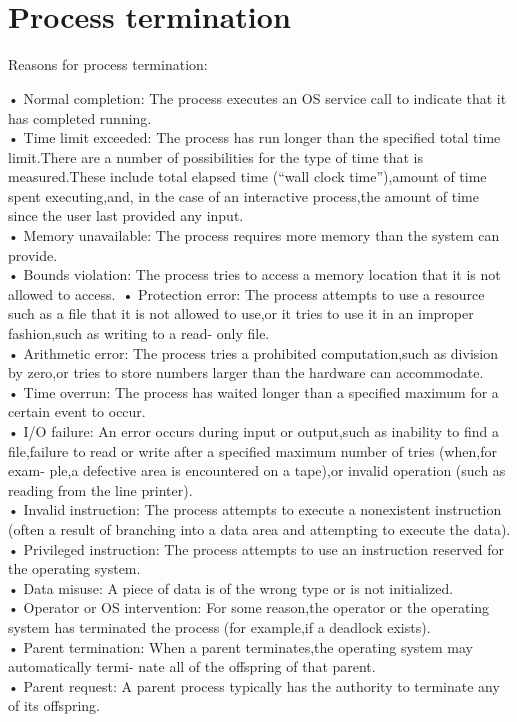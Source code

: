 \\
\\

\section{Process termination}

Reasons for process termination:\

• Normal completion: The process executes an OS service call to indicate that it has completed
running.\\
• Time limit exceeded: The process has run longer than the specified total time limit.There are a
number of possibilities for the type of time that is measured.These include
total elapsed time (“wall clock time”),amount of time spent executing,and,
in the case of an interactive process,the amount of time since the user last
provided any input.\\
• Memory unavailable: The process requires more memory than the system can provide.\\
• Bounds violation: The process tries to access a memory location that it is not allowed to access.\
• Protection error: The process attempts to use a resource such as a file that it is not allowed
to use,or it tries to use it in an improper fashion,such as writing to a read-
only file.\\
• Arithmetic error: The process tries a prohibited computation,such as division by zero,or tries
to store numbers larger than the hardware can accommodate.\\
• Time overrun: The process has waited longer than a specified maximum for a certain event
to occur.\\
• I/O failure: An error occurs during input or output,such as inability to find a file,failure
to read or write after a specified maximum number of tries (when,for exam-
ple,a defective area is encountered on a tape),or invalid operation (such as
reading from the line printer).\\
• Invalid instruction: The process attempts to execute a nonexistent instruction (often a result of
branching into a data area and attempting to execute the data).\\
• Privileged instruction: The process attempts to use an instruction reserved for the operating system.\\
• Data misuse: A piece of data is of the wrong type or is not initialized.\\
• Operator or OS intervention: For some reason,the operator or the operating system has terminated the
process (for example,if a deadlock exists).\\
• Parent termination: When a parent terminates,the operating system may automatically termi-
nate all of the offspring of that parent.\\
• Parent request: A parent process typically has the authority to terminate any of its offspring.\\


